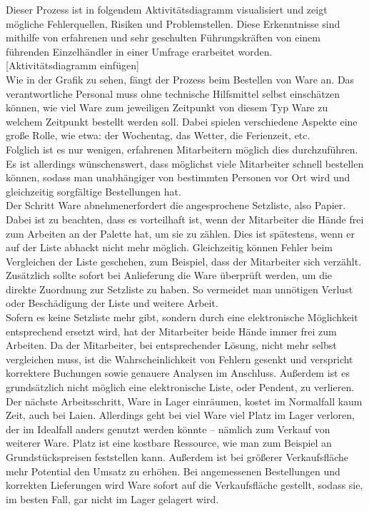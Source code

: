 Dieser Prozess ist in folgendem Aktivitätsdiagramm visualisiert und zeigt mögliche Fehlerquellen, Risiken und Problemstellen. Diese Erkenntnisse sind mithilfe von erfahrenen und sehr geschulten Führungskräften von einem führenden Einzelhändler in einer Umfrage erarbeitet worden.\\

[Aktivitätsdiagramm einfügen]\\

Wie in der Grafik zu sehen, fängt der Prozess beim Bestellen von Ware an. Das verantwortliche Personal muss ohne technische Hilfsmittel selbst einschätzen können, wie viel Ware zum jeweiligen Zeitpunkt von diesem Typ Ware zu welchem Zeitpunkt bestellt werden soll. Dabei spielen verschiedene Aspekte eine große Rolle, wie etwa: der Wochentag, das Wetter, die Ferienzeit, etc.\\

Folglich ist es nur wenigen, erfahrenen Mitarbeitern möglich dies durchzuführen. Es ist allerdings wünschenswert, dass möglichst viele Mitarbeiter schnell bestellen können, sodass man unabhängiger von bestimmten Personen vor Ort wird und gleichzeitig sorgfältige Bestellungen hat.\\

Der Schritt \glqq Ware abnehmen\grqq erfordert die angesprochene Setzliste, also Papier. Dabei ist zu beachten, dass es vorteilhaft ist, wenn der Mitarbeiter die Hände frei zum Arbeiten an der Palette hat, um sie zu zählen. Dies ist spätestens, wenn er auf der Liste abhackt nicht mehr möglich. Gleichzeitig können Fehler beim Vergleichen der Liste geschehen, zum Beispiel, dass der Mitarbeiter sich verzählt. Zusätzlich sollte sofort bei Anlieferung die Ware überprüft werden, um die direkte Zuordnung zur Setzliste zu haben. So vermeidet man unnötigen Verlust oder Beschädigung der Liste und weitere Arbeit.\\

Sofern es keine Setzliste mehr gibt, sondern durch eine elektronische Möglichkeit entsprechend ersetzt wird, hat der Mitarbeiter beide Hände immer frei zum Arbeiten. Da der Mitarbeiter, bei entsprechender Lösung, nicht mehr selbst vergleichen muss, ist die Wahrscheinlichkeit von Fehlern gesenkt und verspricht korrektere Buchungen sowie genauere Analysen im Anschluss. Außerdem ist es grundsätzlich nicht möglich eine elektronische Liste, oder Pendent, zu verlieren.\\

Der nächste Arbeitsschritt, \glqq Ware in Lager einräumen\grqq , kostet im Normalfall kaum Zeit, auch bei Laien. Allerdings geht bei viel Ware viel Platz im Lager verloren, der im Idealfall anders genutzt werden könnte – nämlich zum Verkauf von weiterer  Ware. Platz ist eine kostbare Ressource, wie man zum Beispiel an Grundstückspreisen feststellen kann. Außerdem ist bei größerer Verkaufsfläche mehr Potential den Umsatz zu erhöhen. Bei angemessenen Bestellungen und korrekten Lieferungen wird Ware sofort auf die Verkaufsfläche gestellt, sodass sie, im besten Fall, gar nicht im Lager gelagert wird.\\

